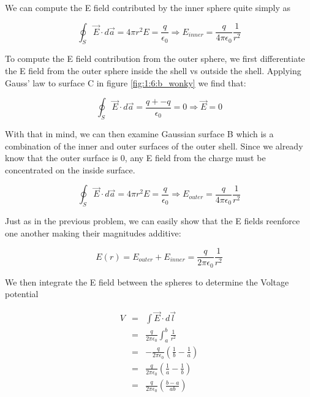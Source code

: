 We can compute the E field contributed by the inner sphere quite
simply as

\begin{equation}
  \oint_S{\vec{E}\cdot d\vec{a}}
    = 4\pi r^2E
    = \frac{q}{\epsilon_0}
    \Rightarrow E_{inner} = \frac{q}{4\pi\epsilon_0}\frac{1}{r^2}
\end{equation}

To compute the E field contribution from the outer sphere, we first
differentiate the E field from the outer sphere inside the shell vs
outside the shell.  Applying Gauss' law to surface C in figure
\ref{fig:1:6:b_wonky} we find that:

\begin{equation}
  \oint_S{\vec{E}\cdot d\vec{a}} = \frac{q + -q}{\epsilon_0} = 0
    \Rightarrow \vec{E} = 0
\end{equation}

With that in mind, we can then examine Gaussian surface B which is a
combination of the inner and outer surfaces of the outer shell.  Since
we already know that the outer surface is 0, any E field from the
charge must be concentrated on the inside surface.

\begin{equation}
  \oint_S{\vec{E}\cdot d\vec{a}}
    = 4\pi r^2 E = \frac{q}{\epsilon_0}
    \Rightarrow E_{outer} = \frac{q}{4 \pi \epsilon_0} \frac{1}{r^2}
\end{equation}

Just as in the previous problem, we can easily show that the E fields
reenforce one another making their magnitudes additive:

\begin{equation}
  E(r) = E_{outer} + E_{inner}
  = \frac{q}{2 \pi \epsilon_0} \frac{1}{r^2}
\end{equation}

We then integrate the E field between the spheres to determine the
Voltage potential

\begin{equation}
  \begin{array}{lcl}
    V & = & \int \vec{E} \cdot d\vec{l}\\
    & = & \frac{q}{2 \pi \epsilon_0} \int_{a}^{b} \frac{1}{r^2}\\
    & = & - \frac{q}{2 \pi \epsilon_0} \left( \frac 1 b - \frac 1 a \right)\\
    & = & \frac{q}{2 \pi \epsilon_0} \left( \frac 1 a - \frac 1 b \right) \\ 
    & = & \frac{q}{2 \pi \epsilon_0} \left( \frac{b - a}{ab} \right) \\
  \end{array}
\end{equation}

